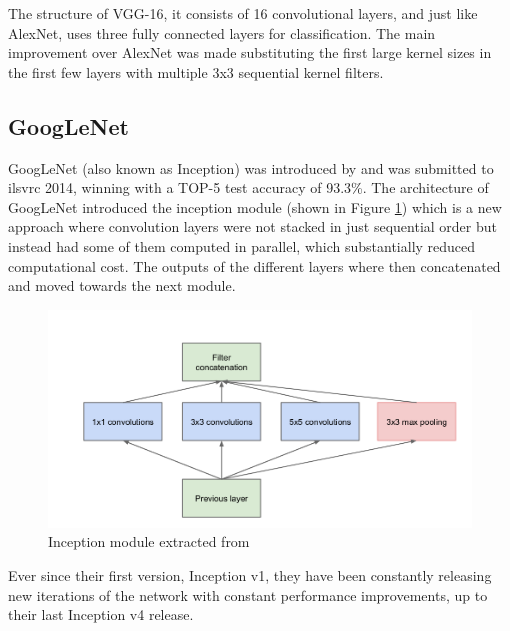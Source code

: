 The structure of VGG-16, it consists of 16 convolutional layers, and just like AlexNet, uses three fully connected layers for classification. The main improvement over AlexNet was made substituting the first large kernel sizes in the first few layers with multiple 3x3 sequential kernel filters.

\subsection{GoogLeNet}
GoogLeNet (also known as Inception) was introduced by \cite{DBLP:journals/corr/SzegedyLJSRAEVR14} and was submitted to \gls{ilsvrc} 2014, winning with a TOP-5 test accuracy of 93.3\%. The architecture of GoogLeNet introduced the inception module (shown in Figure \ref{inception}) which is a new approach where convolution layers were not stacked in just sequential order but instead had some of them computed in parallel, which substantially reduced computational cost. The outputs of the different layers where then concatenated and moved towards the next module.

\begin{figure}
	\includegraphics[scale=0.3]{archivos/inception_module.png}
	\centering
	\caption{Inception module extracted from \cite{DBLP:journals/corr/SzegedyLJSRAEVR14}}
	\label{inception}
\end{figure}

Ever since their first version, Inception v1, they have been constantly releasing new iterations of the network with constant performance improvements, up to their last Inception v4 release.

